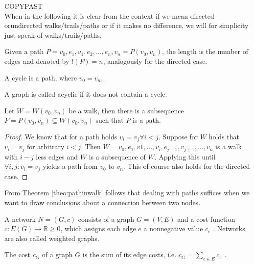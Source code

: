 COPYPAST\\
When in the following it is clear from the context if we mean directed orundirected walks/trails/paths or if it makes no difference, we will for simplicity just speak of walks/trails/paths.

\begin{definition}
Given a path $P = v_0,e_1,v_1,e_2,\ldots ,e_n,v_n = P(v_0,v_n)$, the length is the number of edges and denoted by $l(P) = n$, analogously for the directed case.
\end{definition}

\begin{definition}[Cycle]
A cycle is a path, where $v_0 = v_n$.
\end{definition}

\begin{definition}
A graph is called acyclic if it does not contain a cycle.
\end{definition}

\begin{theorem}
Let $W = W(v_0,v_n)$ be a walk, then there is a subsequence $P = P(v_0,v_n) \subseteq W(v_0,v_n)$ such that $P$ is a path.
\label{theo:pathinwalk}
\end{theorem}
\begin{proof}
We know that for a path holds $v_i = v_j \forall i < j$. Suppose for $W$ holds that $v_i = v_j$ for arbitrary $i < j$. Then $W = v_0,e_1,v1,\ldots,v_i,e_{j+1},v_{j+1},\ldots,v_n$ is a walk with $i-j$ less edges and $W$ is a subsequence of $W$. Applying this until $\forall i, j : v_i = v_j$ yields a path from $v_0$ to $v_n$. This of course also holds for the directed case.
\end{proof}

From Theorem \ref{theo:pathinwalk} follows that dealing with paths suffices when we want to draw conclusions about a connection between two nodes.

\begin{definition}[Network]
A network $N = (G, c)$ consists of a graph $G = (V, E)$ and a cost function $c : E(G) \longrightarrow \mathbb{R} \geq 0$, which assigns each edge $e$ a nonnegative value $c_e$ . Networks are also called weighted graphs.
\end{definition}

\begin{definition}
The cost $c_G$ of a graph $G$ is the sum of its edge costs, i.e. $c_G = \sum_{e\in E}c_e$ .
\end{definition}

